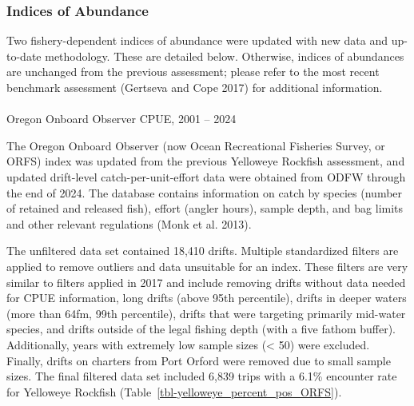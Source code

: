 \documentclass[
]{scrartcl}
\makeatletter
\let\oldparagraph\paragraph
\renewcommand{\paragraph}{
    \@ifstar
      \xxxParagraphStar
      \xxxParagraphNoStar
  }
\newcommand{\xxxParagraphStar}[1]{\oldparagraph*{#1}\mbox{}}
\newcommand{\xxxParagraphNoStar}[1]{\oldparagraph{#1}\mbox{}}
\makeatother
\begin{document}
\subsubsection{Indices of Abundance}\label{indices-of-abundance}

Two fishery-dependent indices of abundance were updated with new data
and up-to-date methodology. These are detailed below. Otherwise, indices
of abundances are unchanged from the previous assessment; please refer
to the most recent benchmark assessment (Gertseva and Cope 2017) for
additional information.

\paragraph{Oregon Onboard Observer CPUE, 2001 --
2024}\label{oregon-onboard-observer-cpue-2001-2024}

The Oregon Onboard Observer (now Ocean Recreational Fisheries Survey, or
ORFS) index was updated from the previous Yelloweye Rockfish assessment,
and updated drift-level catch-per-unit-effort data were obtained from
ODFW through the end of 2024. The database contains information on catch
by species (number of retained and released fish), effort (angler
hours), sample depth, and bag limits and other relevant regulations
(Monk et al. 2013).

The unfiltered data set contained 18,410 drifts. Multiple standardized
filters are applied to remove outliers and data unsuitable for an index.
These filters are very similar to filters applied in 2017 and include
removing drifts without data needed for CPUE information, long drifts
(above 95th percentile), drifts in deeper waters (more than 64fm, 99th
percentile), drifts that were targeting primarily mid-water species, and
drifts outside of the legal fishing depth (with a five fathom buffer).
Additionally, years with extremely low sample sizes (\textless{} 50)
were excluded. Finally, drifts on charters from Port Orford were removed
due to small sample sizes. The final filtered data set included 6,839
trips with a 6.1\% encounter rate for Yelloweye Rockfish
(Table~\ref{tbl-yelloweye_percent_pos_ORFS}).
\end{document}

